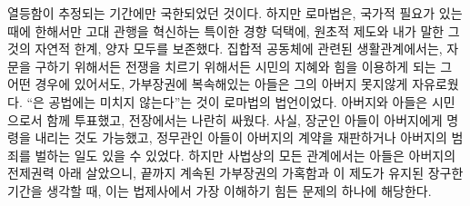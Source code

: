 열등함이 추정되는 기간에만 국한되었던 것이다.
하지만 로마법은,
국가적 필요가 있는 때에 한해서만 고대 관행을 혁신하는 특이한 경향 덕택에,
원초적 제도와 내가 말한 그것의 자연적 한계, 양자 모두를 보존했다.
집합적 공동체에 관련된 생활관계에서는,
자문을 구하기 위해서든 전쟁을 치르기 위해서든
시민의 지혜와 힘을 이용하게 되는 그 어떤 경우에 있어서도,
가부장권에 복속해있는 아들은 그의 아버지 못지않게
자유로웠다.
``은 공법에는 미치지
않는다''는 것이 로마법의 법언이었다.
아버지와 아들은 시민으로서 함께 투표했고, 전장에서는 나란히 싸웠다.
사실, 장군인 아들이 아버지에게 명령을 내리는 것도 가능했고,
정무관인 아들이 아버지의 계약을 재판하거나
아버지의 범죄를 벌하는 일도 있을 수 있었다.
하지만 사법상의 모든 관계에서는
아들은 아버지의 전제권력 아래 살았으니,
끝까지 계속된 가부장권의 가혹함과
이 제도가 유지된 장구한 기간을 생각할 때,
이는 법제사에서 가장 이해하기 힘든 문제의 하나에 해당한다.

